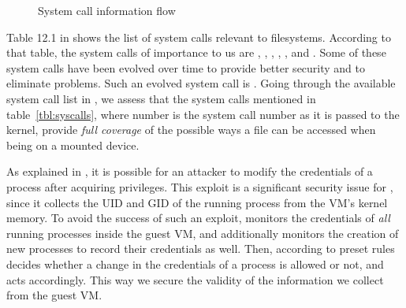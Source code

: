 \begin{figure}[ht]
	\centering
	
	\caption{System call information flow}
	\label{fig:syscall}
\end{figure}

\par Table 12.1 in \cite{linuxkernel} shows the list of system calls relevant to filesystems. According to that table, the system calls of importance to us are , , , , , and . Some of these system calls have been evolved over time to provide better security and to eliminate problems. Such an evolved system call is . Going through the available system call list in , we assess that the system calls mentioned in table~\ref{tbl:syscalls}, where number is the system call number as it is passed to the kernel, provide \emph{full coverage} of the possible ways a file can be accessed when being on a mounted device. 

\par As explained in \cite{perla2010guide}, it is possible for an attacker to modify the credentials of a process after acquiring  privileges. This exploit is a significant security issue for , since it collects the \ac{UID} and \ac{GID} of the running process from the \ac{VM}'s kernel memory. To avoid the success of such an exploit,  monitors the credentials of \emph{all} running processes inside the guest \ac{VM}, and additionally monitors the creation of new processes to record their credentials as well. Then, according to preset rules  decides whether a change in the credentials of a process is allowed or not, and acts accordingly. This way we secure the validity of the information we collect from the guest \ac{VM}.


